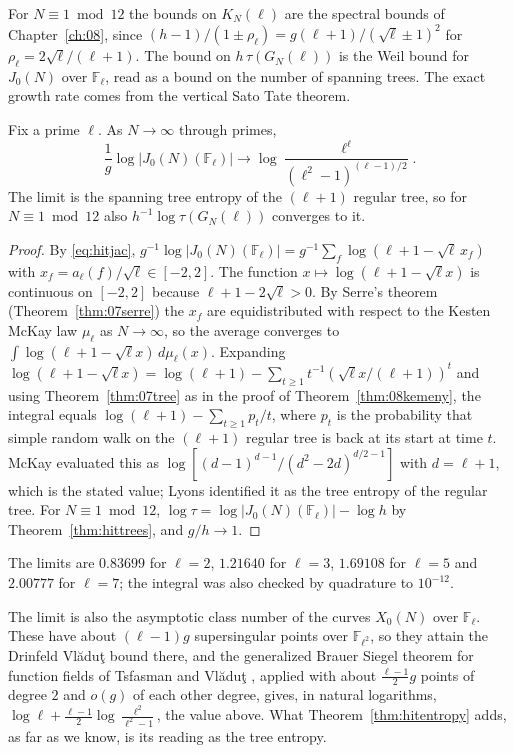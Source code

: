 For $N\equiv1\bmod12$ the bounds on $K_N(\ell)$ are the spectral bounds of Chapter~\ref{ch:08}, since $(h-1)/(1\pm\rho_\ell)=g(\ell+1)/(\sqrt\ell\pm1)^2$ for $\rho_\ell=2\sqrt\ell/(\ell+1)$. The bound on $h\,\tau(G_N(\ell))$ is the Weil bound for $J_0(N)$ over $\mathbb F_\ell$, read as a bound on the number of spanning trees. The exact growth rate comes from the vertical Sato Tate theorem.

\begin{theorem}\label{thm:hitentropy}
Fix a prime $\ell$. As $N\to\infty$ through primes,
\[
\frac1g\log|J_0(N)(\mathbb F_\ell)|\longrightarrow\log\frac{\ell^\ell}{(\ell^2-1)^{(\ell-1)/2}} .
\]
The limit is the spanning tree entropy of the $(\ell+1)$ regular tree, so for $N\equiv1\bmod12$ also $h^{-1}\log\tau(G_N(\ell))$ converges to it.
\end{theorem}

\begin{proof}
By \eqref{eq:hitjac}, $g^{-1}\log|J_0(N)(\mathbb F_\ell)|=g^{-1}\sum_f\log(\ell+1-\sqrt\ell\,x_f)$ with $x_f=a_\ell(f)/\sqrt\ell\in[-2,2]$. The function $x\mapsto\log(\ell+1-\sqrt\ell x)$ is continuous on $[-2,2]$ because $\ell+1-2\sqrt\ell>0$. By Serre's theorem (Theorem~\ref{thm:07serre}) the $x_f$ are equidistributed with respect to the Kesten McKay law $\mu_\ell$ as $N\to\infty$, so the average converges to $\int\log(\ell+1-\sqrt\ell x)\,d\mu_\ell(x)$. Expanding $\log(\ell+1-\sqrt\ell x)=\log(\ell+1)-\sum_{t\ge1}t^{-1}(\sqrt\ell x/(\ell+1))^t$ and using Theorem~\ref{thm:07tree} as in the proof of Theorem~\ref{thm:08kemeny}, the integral equals $\log(\ell+1)-\sum_{t\ge1}p_t/t$, where $p_t$ is the probability that simple random walk on the $(\ell+1)$ regular tree is back at its start at time $t$. McKay \cite{mckay1983} evaluated this as $\log[(d-1)^{d-1}/(d^2-2d)^{d/2-1}]$ with $d=\ell+1$, which is the stated value; Lyons \cite{lyons2005} identified it as the tree entropy of the regular tree. For $N\equiv1\bmod12$, $\log\tau=\log|J_0(N)(\mathbb F_\ell)|-\log h$ by Theorem~\ref{thm:hittrees}, and $g/h\to1$.
\end{proof}

The limits are $0.83699$ for $\ell=2$, $1.21640$ for $\ell=3$, $1.69108$ for $\ell=5$ and $2.00777$ for $\ell=7$; the integral was also checked by quadrature to $10^{-12}$.

The limit is also the asymptotic class number of the curves $X_0(N)$ over $\mathbb F_\ell$. These have about $(\ell-1)g$ supersingular points over $\mathbb F_{\ell^2}$, so they attain the Drinfeld Vl\u{a}du\c{t} bound there, and the generalized Brauer Siegel theorem for function fields of Tsfasman and Vl\u{a}du\c{t} \cite[Corollary~D$'$]{tsfasmanvladut2002}, applied with about $\frac{\ell-1}2g$ points of degree $2$ and $o(g)$ of each other degree, gives, in natural logarithms, $\log\ell+\frac{\ell-1}2\log\frac{\ell^2}{\ell^2-1}$, the value above. What Theorem~\ref{thm:hitentropy} adds, as far as we know, is its reading as the tree entropy.

